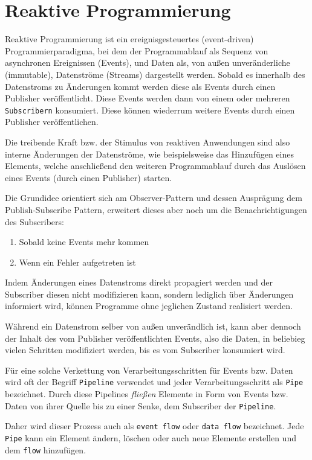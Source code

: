 \section{Reaktive Programmierung}
\label{section:reaktive_programmierung}
Reaktive Programmierung ist ein ereignisgesteuertes (event-driven) Programmierparadigma, bei dem der Programmablauf
als Sequenz von asynchronen Ereignissen (Events), und Daten als, von außen unveränderliche (immutable), Datenströme (Streams) dargestellt werden.
Sobald es innerhalb des Datenstroms zu Änderungen kommt werden diese als Events durch einen Publisher veröffentlicht.
Diese Events werden dann von einem oder mehreren \verb|Subscribern| konsumiert. Diese können wiederrum weitere Events durch einen Publisher veröffentlichen.

Die treibende Kraft bzw. der Stimulus von reaktiven Anwendungen sind also interne Änderungen der Datenströme, wie beispielsweise das
Hinzufügen eines Elements, welche anschließend den weiteren Programmablauf durch das Auslösen eines Events (durch einen Publisher) starten.

Die Grundidee orientiert sich am Observer-Pattern und dessen Ausprägung dem Publish-Subscribe Pattern, erweitert dieses aber
noch um die Benachrichtigungen des Subscribers:
\begin{enumerate}
    \item Sobald keine Events mehr kommen
    \item Wenn ein Fehler aufgetreten ist
\end{enumerate}
Indem Änderungen eines Datenstroms direkt propagiert werden und der Subscriber diesen nicht modifizieren kann, sondern lediglich über Änderungen informiert wird,
können Programme ohne jeglichen Zustand realisiert werden\parencite{Escoffier2017}.

Während ein Datenstrom selber von außen unverändlich ist, kann aber dennoch der Inhalt
des vom Publisher veröffentlichten Events, also die Daten, in beliebieg vielen Schritten modifiziert werden, bis es vom
Subscriber konsumiert wird.

Für eine solche Verkettung von Verarbeitungsschritten für Events bzw. Daten
wird oft der Begriff \verb|Pipeline| verwendet und jeder Verarbeitungsschritt als \verb|Pipe| bezeichnet.
Durch diese Pipelines \textit{fließen} Elemente in Form von Events bzw. Daten von ihrer Quelle
bis zu einer Senke, dem Subscriber der \verb|Pipeline|.

Daher wird dieser Prozess auch als \verb|event flow| oder \verb|data flow| bezeichnet.
Jede \verb|Pipe| kann ein Element ändern, löschen oder auch neue Elemente erstellen und dem \verb|flow| hinzufügen.


